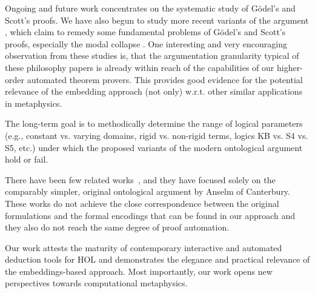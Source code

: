 \documentclass{llncs}
\begin{document}
Ongoing and future work concentrates on the systematic study of
G\"odel's and Scott's proofs. We have also begun to study more recent
variants of the argument
\cite{anderson90:_some_emend_of_goedel_ontol_proof,AndersonGettings,bjordal99,fuhrmann05:_exist_notwen,fitting02:_types_tableaus_god,Hajek2002,Hajek2008},
which claim to remedy some fundamental problems of G\"odel's and
Scott's proofs, especially the modal collapse \cite{C41}.  One interesting
and very encouraging observation from these studies is, that the
argumentation granularity typical of these philosophy
papers is already within reach of the capabilities 
of our higher-order automated theorem provers.
This provides good evidence for the potential 
relevance of the embedding approach (not only) w.r.t. 
other similar applications in metaphysics.


The long-term goal
is to methodically determine the range of logical parameters (e.g.,
constant vs. varying domains, rigid vs. non-rigid terms, logics KB vs.
S4 vs. S5, etc.) under which the proposed variants of the modern
ontological argument hold or fail.

There have been few related works~\cite{oppenheimera11,rushby13}, 
and they have
focused solely on the comparably simpler, original ontological
argument by Anselm of Canterbury. These works do not achieve the
close correspondence between the original formulations and the formal
encodings that can be found in our approach and they also do not reach
the same degree of proof automation.

Our work attests the maturity of contemporary interactive and
automated deduction tools for HOL and
demonstrates the elegance and practical relevance of the
embeddings-based approach. Most importantly, our work opens new
perspectives towards computational metaphysics.






%
\end{document}
